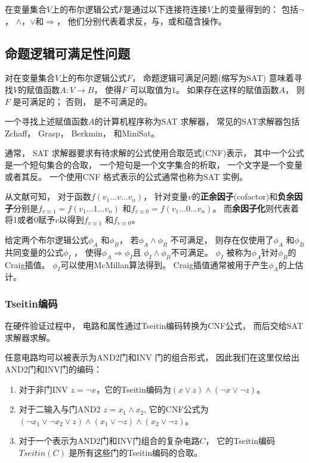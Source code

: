 在变量集合$V$上的布尔逻辑公式$F$是通过以下连接符连接$V$上的变量得到的：
包括$\neg$， $\wedge$，$\vee$和$\Rightarrow$，
他们分别代表着求反，与，或和蕴含操作。

\subsection{命题逻辑可满足性问题}

对在变量集合$V$上的布尔逻辑公式$F$，
命题逻辑可满足问题(缩写为SAT)
意味着寻找$V$的赋值函数$A:V\to B$，
使得$F$ 可以取值为$1$。
如果存在这样的赋值函数$A$，
则$F$ 是可满足的；
否则，
是不可满足的。

一个寻找上述赋值函数$A$的计算机程序称为SAT 求解器，
常见的SAT求解器包括Zchaff，
Grasp，
Berkmin，
和MiniSat。


通常，
SAT 求解器要求有待求解的公式使用合取范式(CNF)表示，
其中一个公式是一个短句集合的合取，
一个短句是一个文字集合的析取，
一个文字是一个变量或者其反。
一个使用CNF 格式表示的公式通常也称为SAT 实例。


从文献可知，
对于函数$f(v_1\dots v\dots v_n)$，
针对变量$v$的\textbf{正余因子}(cofactor)和\textbf{负余因子}分别是$f_{v\equiv 1}=f(v_1\dots 1\dots v_n)$ 和$f_{v\equiv 0}=f(v_1\dots 0\dots v_n)$。
而\textbf{余因子化}则代表着将1或者0赋予$v$以得到$f_{v\equiv 1}$ 和$f_{v\equiv 0}$。

给定两个布尔逻辑公式$\phi_A$ 和$\phi_B$，
若$\phi_A\wedge \phi_B$ 不可满足，
则存在仅使用了$\phi_A$ 和$\phi_B$共同变量的公式$\phi_I$ ，
 使得$\phi_A\Rightarrow \phi_I$且
$\phi_I\wedge \phi_B$不可满足。
$\phi_I$ 被称为$\phi_A$针对$\phi_B$的Craig插值。
$\phi_I$可以使用McMillan算法得到。
Craig插值通常被用于产生$\phi_A$的上估计。

\subsubsection{Tseitin编码}\label{subsubsec_tseitin}
在硬件验证过程中，
电路和属性通过Tseitin编码转换为CNF公式，
而后交给SAT求解器求解。

任意电路均可以被表示为AND2门和INV 门的组合形式，
因此我们在这里仅给出AND2门和INV门的编码：
\begin{enumerate}
\item 对于非门INV $z=\neg x$，它的Tseitin编码为$(x\vee z)\wedge( \neg x\vee \neg z)$。
\item 对于二输入与门AND2 $z=x_1\wedge x_2$,
它的CNF公式为$( \neg x_1\vee \neg x_2\vee z)\wedge(x_1\vee \neg z) \wedge(x_2\vee \neg z)$。
\item 对于一个表示为AND2门和INV门组合的复杂电路$C$，
它的Tseitin编码$Tseitin(C)$ 是所有这些门的Tseitin编码的合取。
\end{enumerate}

